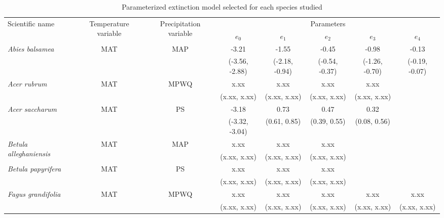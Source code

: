\documentclass[11pt]{article}
\begin{document}

\newcommand{\ts}{\scriptsize}
\begin{table}[tb]
\small
\begin{threeparttable}
\label{tab:model_selection}
\caption{Parameterized extinction model selected for each species studied}
\begin{tabular}{lccccccc}
\toprule
\multirow{2}{*}{Scientific name} & \multirow{2}{2cm}{\centering Temperature variable\tnote{*}} & 
\multirow{2}{2cm}{\centering Precipitation variable\tnote{\textdagger}} & \multicolumn{5}{c}{Parameters\tnote{\textdaggerdbl}} \\
& & & $e_0$ & $e_1$ & $e_2$ & $e_3$ & $e_4$ \\ 
\midrule

\multirow{2}{*}{\it Abies balsamea} & \multirow{2}{*}{MAT} & \multirow{2}{*}{MAP} & -3.21\tnote{\textsection} & -1.55 & -0.45 & -0.98 & -0.13 \\
&  &  & {\ts (-3.56, -2.88)} & {\ts (-2.18, -0.94)} & {\ts (-0.54, -0.37)} & {\ts (-1.26, -0.70)} & {\ts (-0.19, -0.07)} \\

\multirow{2}{*}{\it Acer rubrum} & \multirow{2}{*}{MAT} & \multirow{2}{*}{MPWQ} & x.xx & x.xx & x.xx & x.xx & \\
&  &  & {\ts (x.xx, x.xx)} & {\ts (x.xx, x.xx)} & {\ts (x.xx, x.xx)} & {\ts (x.xx, x.xx)} &  \\

\multirow{2}{*}{\it Acer saccharum} & \multirow{2}{*}{MAT} & \multirow{2}{*}{PS} & -3.18 & 0.73 & 0.47 & 0.32 &  \\
&  &  & {\ts (-3.32, -3.04)} & {\ts (0.61, 0.85)} & {\ts (0.39, 0.55)} & {\ts (0.08, 0.56)} &  \\

\multirow{2}{*}{\it Betula alleghaniensis} & \multirow{2}{*}{MAT} & \multirow{2}{*}{MAP} & x.xx & x.xx & x.xx & & \\
&  &  & {\ts (x.xx, x.xx)} & {\ts (x.xx, x.xx)} & {\ts (x.xx, x.xx)} &  & \\

\multirow{2}{*}{\it Betula papyrifera} & \multirow{2}{*}{MAT} & \multirow{2}{*}{PS} & x.xx & x.xx & x.xx &  &  \\
&  &  & {\ts (x.xx, x.xx)} & {\ts (x.xx, x.xx)} & {\ts (x.xx, x.xx)} &  &  \\

\multirow{2}{*}{\it Fagus grandifolia} & \multirow{2}{*}{MAT} & \multirow{2}{*}{MPWQ} & x.xx & x.xx & x.xx & x.xx & x.xx \\
&  &  & {\ts (x.xx, x.xx)} & {\ts (x.xx, x.xx)} & {\ts (x.xx, x.xx)} & {\ts (x.xx, x.xx)} & {\ts (x.xx, x.xx)} \\


\end{tabular}
\end{threeparttable}
\end{table}
\end{document}
